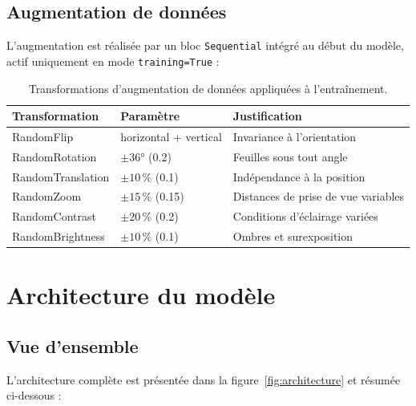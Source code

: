 \documentclass[12pt, a4paper, twoside]{report}
\begin{document}
\subsection{Augmentation de données}

L'augmentation est réalisée par un bloc \texttt{Sequential} intégré au début du modèle, actif uniquement en mode \texttt{training=True} :

\begin{table}[H]
\centering
\caption{Transformations d'augmentation de données appliquées à l'entraînement.}
\label{tab:augmentation}
\begin{tabular}{lll}
\toprule
\textbf{Transformation} & \textbf{Paramètre} & \textbf{Justification} \\
\midrule
RandomFlip              & horizontal + vertical & Invariance à l'orientation \\
RandomRotation          & $\pm 36°$ (0.2)       & Feuilles sous tout angle \\
RandomTranslation       & $\pm 10\,\%$ (0.1)    & Indépendance à la position \\
RandomZoom              & $\pm 15\,\%$ (0.15)   & Distances de prise de vue variables \\
RandomContrast          & $\pm 20\,\%$ (0.2)    & Conditions d'éclairage variées \\
RandomBrightness        & $\pm 10\,\%$ (0.1)    & Ombres et surexposition \\
\bottomrule
\end{tabular}
\end{table}

\section{Architecture du modèle}

\subsection{Vue d'ensemble}

L'architecture complète est présentée dans la figure~\ref{fig:architecture} et résumée ci-dessous :
\end{document}
